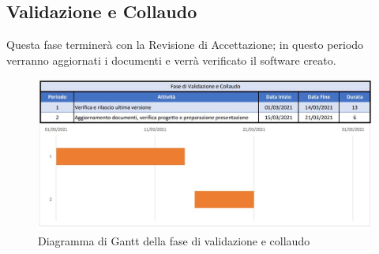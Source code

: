 \documentclass[../piano_di_progetto.tex]{subfiles}
\begin{document}
\subsection{Validazione e Collaudo}%
\label{sub:valid_coll}
Questa fase terminerà con la Revisione di Accettazione; in questo periodo verranno aggiornati i documenti e verrà verificato il software creato. 

\begin{figure}[H]
\centering
\includegraphics[width=12cm]{fase_valid_collaudo}
\caption{Diagramma di Gantt della fase di validazione e collaudo}
\end{figure}
\end{document}

